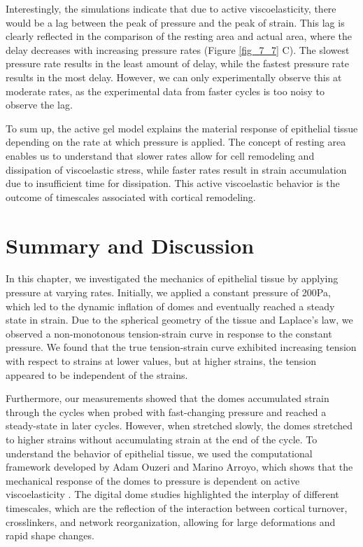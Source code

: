 Interestingly, the simulations indicate that due to active
viscoelasticity, there would be a lag between the peak of pressure and
the peak of strain. This lag is clearly reflected in the comparison of
the resting area and actual area, where the delay decreases with
increasing pressure rates (Figure \ref{fig_7_7} C).
The slowest pressure rate results in the least amount of delay, while
the fastest pressure rate results in the most delay. However, we can
only experimentally observe this at moderate rates, as the experimental
data from faster cycles is too noisy to observe the lag.

To sum up, the active gel model explains the material response of
epithelial tissue depending on the rate at which pressure is applied.
The concept of resting area enables us to understand that slower rates
allow for cell remodeling and dissipation of viscoelastic stress, while
faster rates result in strain accumulation due to insufficient time for
dissipation. This active viscoelastic behavior is the outcome of
timescales associated with cortical remodeling.

\newpage
\hypertarget{summary}{%
	\section{Summary and Discussion}\label{summary}}

In this chapter, we investigated the mechanics of epithelial tissue by
applying pressure at varying rates. Initially, we applied a constant
pressure of 200Pa, which led to the dynamic inflation of domes and
eventually reached a steady state in strain. Due to the spherical
geometry of the tissue and Laplace's law, we observed a non-monotonous
tension-strain curve in response to the constant pressure. We found that
the true tension-strain curve exhibited increasing tension with respect
to strains at lower values, but at higher strains, the tension appeared
to be independent of the strains.

Furthermore, our measurements showed that the domes accumulated strain
through the cycles when probed with fast-changing pressure and reached a
steady-state in later cycles. However, when stretched slowly, the domes
stretched to higher strains without accumulating strain at the end of
the cycle. To understand the behavior of epithelial tissue, we used the
computational framework developed by Adam Ouzeri and Marino Arroyo,
which shows that the mechanical response of the domes to pressure is
dependent on active viscoelasticity \cite{ouzeri2023}. The digital dome studies
highlighted the interplay of different timescales, which are the
reflection of the interaction between cortical turnover, crosslinkers,
and network reorganization, allowing for large deformations and rapid
shape changes.

